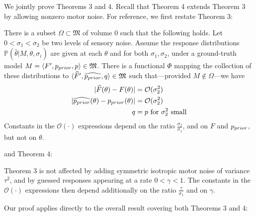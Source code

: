 We jointly prove Theorems 3 and 4. Recall that Theorem 4 extends Theorem 3 by allowing nonzero motor noise.
For reference, we first restate Theorem 3:
\begin{thm}\label{thm:identifiability2}

There is a subset $\Omega \subset \mathfrak{M}$ of volume $0$ such that the following holds.
Let $0 < \sigma_1 < \sigma_2$ be two levels of sensory noise. %
Assume the %
response distributions $\mathbb{P}(\widehat{\theta}|M,\theta, \sigma_i)$ are given at each $\theta$ and for both $\sigma_1, \sigma_2$, under a ground-truth model $M = \langle F', p_{prior},p \rangle \in \mathfrak{M}$.
There is a functional $\Phi$ mapping the collection of these distributions to $\langle \widehat{F}', \widehat{p_{prior}},q \rangle \in \mathfrak{M}$
such that---provided $M \not\in \Omega$---we have
\begin{align*}
    |\widehat{F}(\theta) - F(\theta)| &= \mathcal{O}(\sigma_2^2) \\
    |\widehat{p_{prior}}(\theta) - p_{prior}(\theta)| &= \mathcal{O}(\sigma_2^2) \\
    q &= p  \text{ for $\sigma_2^2$ small}
\end{align*}
Constants in the $\mathcal{O}(\cdot)$ expressions depend on the ratio $\frac{\sigma_2}{\sigma_1}$, and on $F$ and $p_{prior}$, but not on $\theta$.

\end{thm}
and Theorem 4:
\begin{thm}\label{thm:identifiability2-motor}
Theorem 3 is not affected by adding symmetric isotropic motor noise of variance $\tau^2$, and by guessed responses appearing at a rate $0 < \gamma < 1$. The constants in the $\mathcal{O}(\cdot)$ expressions then depend additionally on the ratio $\frac{\tau}{\sigma_1}$ and on $\gamma$.
\end{thm}
Our proof applies directly to the overall result covering both Theorems 3 and 4:

